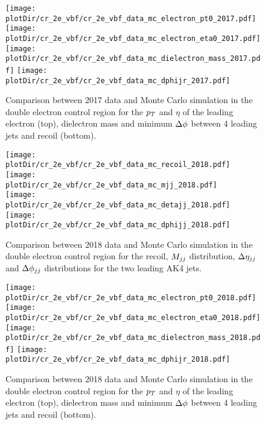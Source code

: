 \begin{figure}[htbp]
    \begin{center}
        \texttt{[image: \\plotDir/cr\_2e\_vbf/cr\_2e\_vbf\_data\_mc\_electron\_pt0\_2017.pdf]}
        \texttt{[image: \\plotDir/cr\_2e\_vbf/cr\_2e\_vbf\_data\_mc\_electron\_eta0\_2017.pdf]}
        \texttt{[image: \\plotDir/cr\_2e\_vbf/cr\_2e\_vbf\_data\_mc\_dielectron\_mass\_2017.pdf]}
        \texttt{[image: \\plotDir/cr\_2e\_vbf/cr\_2e\_vbf\_data\_mc\_dphijr\_2017.pdf]}
    \end{center}
    \caption{Comparison between 2017 data and Monte Carlo simulation in the double electron control region for
        the $p_T$ and $\eta$ of the leading electron (top), dielectron mass and minimum $\Delta \phi$ between 4 leading jets and recoil (bottom).}
    \label{fig:cr_2e_vbf_2017_mtr_2}
\end{figure}

\begin{figure}[htbp]
    \begin{center}
        \texttt{[image: \\plotDir/cr\_2e\_vbf/cr\_2e\_vbf\_data\_mc\_recoil\_2018.pdf]}
        \texttt{[image: \\plotDir/cr\_2e\_vbf/cr\_2e\_vbf\_data\_mc\_mjj\_2018.pdf]} \\
        \texttt{[image: \\plotDir/cr\_2e\_vbf/cr\_2e\_vbf\_data\_mc\_detajj\_2018.pdf]}
        \texttt{[image: \\plotDir/cr\_2e\_vbf/cr\_2e\_vbf\_data\_mc\_dphijj\_2018.pdf]}
    \end{center}
    \caption{Comparison between 2018 data and Monte Carlo simulation in the double electron control region for
        the recoil, $M_{jj}$ distribution, $\Delta \eta_{jj}$ and $\Delta \phi_{jj}$ distributions for the two leading AK4 jets.}
    \label{fig:cr_2e_vbf_2018_mtr}
\end{figure}

\begin{figure}[htbp]
    \begin{center}
        \texttt{[image: \\plotDir/cr\_2e\_vbf/cr\_2e\_vbf\_data\_mc\_electron\_pt0\_2018.pdf]}
        \texttt{[image: \\plotDir/cr\_2e\_vbf/cr\_2e\_vbf\_data\_mc\_electron\_eta0\_2018.pdf]}
        \texttt{[image: \\plotDir/cr\_2e\_vbf/cr\_2e\_vbf\_data\_mc\_dielectron\_mass\_2018.pdf]}
        \texttt{[image: \\plotDir/cr\_2e\_vbf/cr\_2e\_vbf\_data\_mc\_dphijr\_2018.pdf]}
    \end{center}
    \caption{Comparison between 2018 data and Monte Carlo simulation in the double electron control region for
        the $p_T$ and $\eta$ of the leading electron (top), dielectron mass and minimum $\Delta \phi$ between 4 leading jets and recoil (bottom).}
    \label{fig:cr_2e_vbf_2018_mtr_2}
\end{figure}

